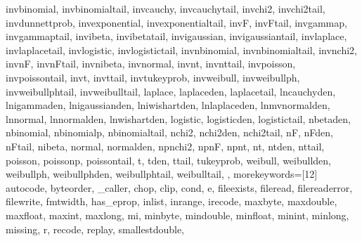 {{        invbinomial, invbinomialtail, invcauchy, invcauchytail, invchi2, 
        invchi2tail, invdunnettprob, invexponential, invexponentialtail, 
        invF, invFtail, invgammap, invgammaptail, invibeta, invibetatail, 
        invigaussian, invigaussiantail, invlaplace, invlaplacetail, 
        invlogistic, invlogistictail, invnbinomial, invnbinomialtail, 
        invnchi2, invnF, invnFtail, invnibeta, invnormal, invnt, invnttail, 
        invpoisson, invpoissontail, invt, invttail, invtukeyprob, 
        invweibull, invweibullph, invweibullphtail, invweibulltail, laplace, 
        laplaceden, laplacetail, lncauchyden, lnigammaden, lnigaussianden, 
        lniwishartden, lnlaplaceden, lnmvnormalden, lnnormal, lnnormalden, 
        lnwishartden, logistic, logisticden, logistictail, nbetaden, 
        nbinomial, nbinomialp, nbinomialtail, nchi2, nchi2den, nchi2tail, 
        nF, nFden, nFtail, nibeta, normal, normalden, npnchi2, npnF, npnt, 
        nt, ntden, nttail, poisson, poissonp, poissontail, t, tden, ttail, 
        tukeyprob, weibull, weibullden, weibullph, weibullphden, 
        weibullphtail, weibulltail,
    },
    morekeywords=[12]{
        autocode, byteorder, _caller, chop, clip, cond, e, fileexists, 
        fileread, filereaderror, filewrite, fmtwidth, has_eprop, inlist, 
        inrange, irecode, maxbyte, maxdouble, maxfloat, maxint, maxlong, mi, 
        minbyte, mindouble, minfloat, minint, minlong, missing, r, recode, 
        replay, smallestdouble,
    }
}


